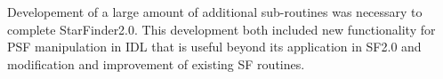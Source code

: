 Developement of a large amount of additional sub-routines was necessary to complete StarFinder2.0. This development both included new functionality for PSF manipulation in IDL that is useful beyond its application in SF2.0 and modification and improvement of existing SF routines.